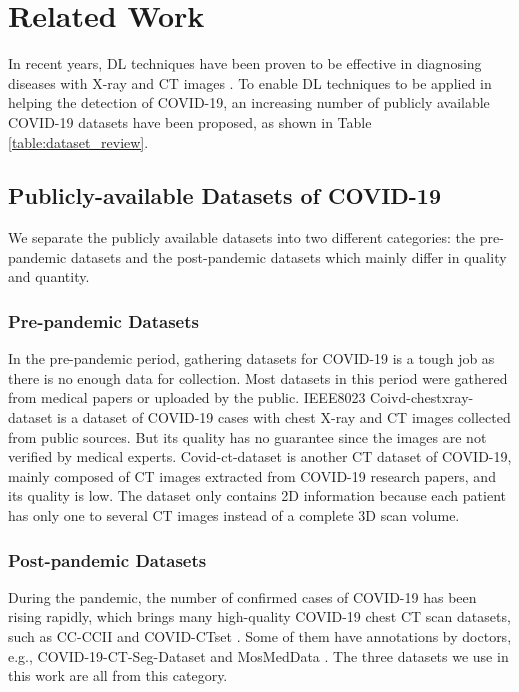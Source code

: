 \documentclass[letterpaper]{article}
\begin{document}
\section{Related Work}
In recent years, DL techniques have been proven to be effective in diagnosing diseases with X-ray and CT images \cite{Litjens2017}. To enable DL techniques to be applied in helping the detection of COVID-19, an increasing number of publicly available COVID-19 datasets have been proposed, as shown in Table \ref{table:dataset_review}.


\subsection{Publicly-available Datasets of COVID-19}
We separate the publicly available datasets into two different categories: the pre-pandemic datasets and the post-pandemic datasets which mainly differ in quality and quantity.

\subsubsection{Pre-pandemic Datasets}
In the pre-pandemic period, gathering datasets for COVID-19 is a tough job as there is no enough data for collection. Most datasets in this period were gathered from medical papers or uploaded by the public. IEEE8023 Coivd-chestxray-dataset \cite{cohen2020covid} is a dataset of COVID-19 cases with chest X-ray and CT images collected from public sources. But its quality has no guarantee since the images are not verified by medical experts. Covid-ct-dataset \cite{zhao2020covidctdataset} is another CT dataset of COVID-19, mainly composed of CT images extracted from COVID-19 research papers, and its quality is low. The dataset only contains 2D information because each patient has only one to several CT images instead of a complete 3D scan volume.

\subsubsection{Post-pandemic Datasets}
During the pandemic, the number of confirmed cases of COVID-19 has been rising rapidly, which brings many high-quality COVID-19 chest CT scan datasets, such as CC-CCII \cite{cell_covid} and COVID-CTset \cite{covid-ctset}. Some of them have annotations by doctors, e.g., COVID-19-CT-Seg-Dataset \cite{COVID-19-CT-Seg-Dataset} and MosMedData \cite{mosmeddata}. The three datasets we use in this work are all from this category.
\end{document}
